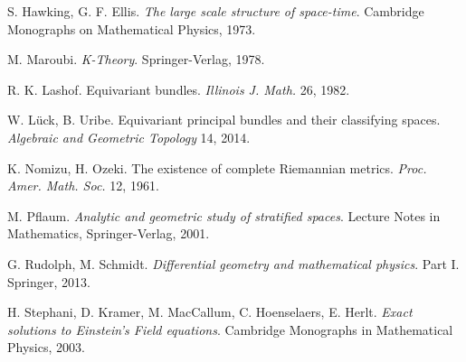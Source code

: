 \documentclass{article}
\begin{document}
\begin{thebibliography}{5}
S. Hawking, G. F. Ellis.
\textit{The large scale structure of space-time}.
Cambridge Monographs on Mathematical Physics, 1973.

M. Maroubi.
\textit{K-Theory}.
Springer-Verlag, 1978.

R. K. Lashof.
Equivariant bundles.
\textit{Illinois J. Math.} 26, 1982.

W. L\"uck, B. Uribe.
Equivariant principal bundles
and their classifying spaces.
\textit{Algebraic and Geometric Topology} 14, 2014.

K. Nomizu, H. Ozeki.
The existence of complete Riemannian metrics.
\textit{Proc. Amer. Math. Soc.} 12, 1961.

M. Pflaum.
\textit{Analytic and geometric study of stratified spaces}.
Lecture Notes in Mathematics, Springer-Verlag, 2001.

G. Rudolph, M. Schmidt.
\textit{Differential geometry and mathematical physics}.
Part I. Springer, 2013.

H. Stephani, D. Kramer, M. MacCallum, C. Hoenselaers, E. Herlt.
\textit{Exact solutions to Einstein's Field equations}.
Cambridge Monographs in Mathematical Physics, 2003.







\end{thebibliography}
\end{document}
